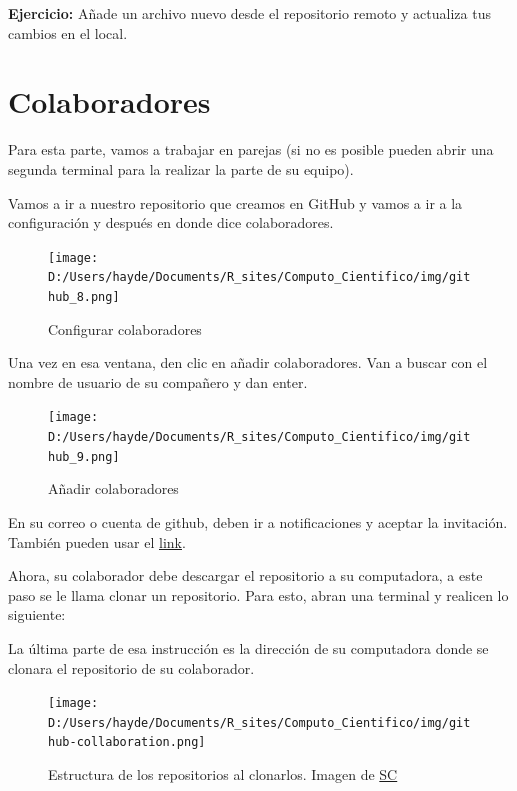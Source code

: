\documentclass[
]{book}
\newenvironment{Shaded}{\begin{snugshade}}{\end{snugshade}}
\newcommand{\ExtensionTok}[1]{#1}
\newcommand{\NormalTok}[1]{#1}
\begin{document}
\textbf{Ejercicio:} Añade un archivo nuevo desde el repositorio remoto y actualiza tus cambios en el local.

\hypertarget{colaboradores}{%
\section{Colaboradores}\label{colaboradores}}

Para esta parte, vamos a trabajar en parejas (si no es posible pueden abrir una segunda terminal para la realizar la parte de su equipo).

Vamos a ir a nuestro repositorio que creamos en GitHub y vamos a ir a la configuración y después en donde dice colaboradores.

\begin{figure}
\centering
\texttt{[image: D:/Users/hayde/Documents/R\_sites/Computo\_Cientifico/img/github\_8.png]}
\caption{Configurar colaboradores}
\end{figure}

Una vez en esa ventana, den clic en añadir colaboradores. Van a buscar con el nombre de usuario de su compañero y dan enter.

\begin{figure}
\centering
\texttt{[image: D:/Users/hayde/Documents/R\_sites/Computo\_Cientifico/img/github\_9.png]}
\caption{Añadir colaboradores}
\end{figure}

En su correo o cuenta de github, deben ir a notificaciones y aceptar la invitación. También pueden usar el \href{https://github.com/notifications}{link}.

Ahora, su colaborador debe descargar el repositorio a su computadora, a este paso se le llama clonar un repositorio. Para esto, abran una terminal y realicen lo siguiente:

\begin{Shaded}
\end{Shaded}

La última parte de esa instrucción es la dirección de su computadora donde se clonara el repositorio de su colaborador.

\begin{figure}
\centering
\texttt{[image: D:/Users/hayde/Documents/R\_sites/Computo\_Cientifico/img/github-collaboration.png]}
\caption{Estructura de los repositorios al clonarlos. Imagen de \href{https://swcarpentry.github.io/git-novice/08-collab.html}{SC}}
\end{figure}
\end{document}
